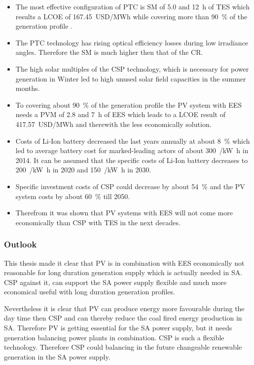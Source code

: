 \begin{itemize}
\item The most effective configuration of PTC is SM of 5.0 and 12~h of TES which results a LCOE of \SI{167.45}{USD/MWh} while covering more than \SI{90}{\percent} of the generation profile .
\item The PTC technology has rising optical efficiency losses during low irradiance angles. Therefore the SM is much higher then that of the CR.
\item The high solar multiples of the CSP technology, which is necessary for power generation in Winter led to high unused solar field capacities in the summer months.
\item To covering about \SI{90}{\percent} of the generation profile the PV system with EES needs a PVM of 2.8 and 7~h of EES which leads to a LCOE result of \SI{417.57}{USD/MWh} and therewith the less economically solution.
\item Costs of Li-Ion battery decreased the last years annually at about \SI{8}{\percent} which led to average battery cost for marked-leading actors of about \SI{300}{\usd/\kilo\watt\hour} in 2014. It can be assumed that the specific costs of Li-Ion battery decreases to \SI{200}{\usd/\kilo\watt\hour} in 2020 and \SI{150}{\usd/\kilo\watt\hour} in 2030.
\item Specific investment costs of CSP could decrease by about \SI{54}{\percent} and the PV system costs by about \SI{60}{\percent} till 2050.
\item Therefrom it was shown that PV systems with EES will not come more economically than CSP with TES in the next decades.
\end{itemize}
\subsubsection{Outlook}
This thesis made it clear that PV is in combination with EES economically not reasonable for long duration generation supply which is actually needed in SA. CSP against it, can support the SA power supply flexible and much more economical useful with long duration generation profiles. 

Nevertheless it is clear that PV can produce energy more favourable during the day time then CSP and can thereby reduce the coal fired energy production in SA. Therefore PV is getting essential for the SA power supply, but it needs generation balancing power plants in combination. CSP is such a flexible technology. Therefore CSP could balancing in the future changeable renewable generation in the SA power supply. 
\clearpage
